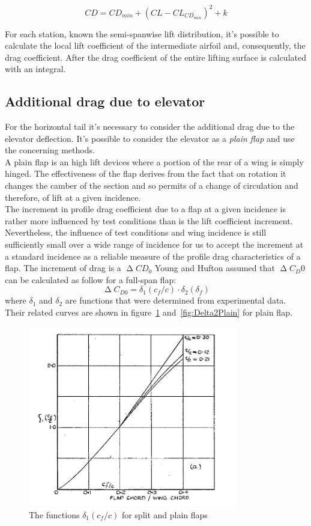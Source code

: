 \begin{equation}
CD = CD_{min} + (CL - CL_{CD_{min}})^2 + k
\end{equation}

For each station, known the semi-spanwise lift distribution, it's possible to calculate the local lift coefficient of the intermediate airfoil and, consequently, the drag coefficient. After the drag coefficient of the entire lifting surface is calculated with an integral.

\subsection{Additional drag due to elevator}

For the horizontal tail it's necessary to consider the additional drag due to the elevator deflection. It's possible to consider the elevator as a {\itshape plain flap} and use the concerning methods. \\
A plain flap is an high lift devices where a portion of the rear of a wing is simply hinged. The effectiveness of the flap derives from the fact that on rotation it changes the camber of the section and so permits of a change of circulation and therefore, of lift at a given incidence. \\
The increment in profile drag coefficient due to a flap at a given incidence is rather more influenced by test conditions than is the lift coefficient
increment. Nevertheless, the influence of test conditions and wing incidence is still sufficiently small over a wide range of incidence for us to accept the increment at a standard incidence as a reliable measure of the profile drag characteristics of a flap. \cite{Young:Flaps} The increment of drag is a $\upDelta CD_0$
Young and Hufton assumed that  $\upDelta C_D0$ can be calculated as follow for a full-span flap:
%
\begin{equation}
\upDelta C_{D0}=\delta_1\left(c_f/c\right)\cdot\delta_2\left(\delta_f\right)
\label{eqn:DeltaCD0FullSpan}
\end{equation}
%
where $\delta_1$ and $\delta_2$ are functions that were determined from experimental data. Their related curves are shown in figure~\ref{fig:Delta1Plain} and~\ref{fig:Delta2Plain} for plain flap.
%
\begin{figure}[H]
\centering
\includegraphics[height=7.9cm]{Immagini/Delta1_Plain}
\caption{The functions $\delta_1\left(c_f/c\right)$ for split and plain flaps}
\label{fig:Delta1Plain}
\end{figure}
